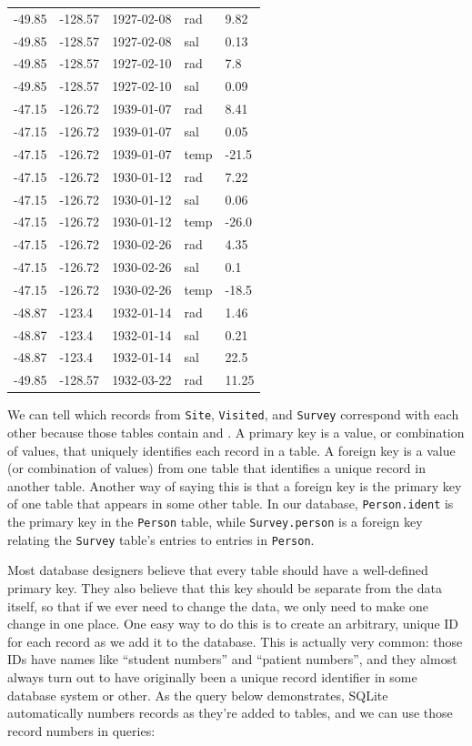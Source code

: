 \documentclass{book}
\begin{document}
\begin{tabular}{lllll}
-49.85 & -128.57 & 1927-02-08 & rad & 9.82 \\
-49.85 & -128.57 & 1927-02-08 & sal & 0.13 \\
-49.85 & -128.57 & 1927-02-10 & rad & 7.8 \\
-49.85 & -128.57 & 1927-02-10 & sal & 0.09 \\
-47.15 & -126.72 & 1939-01-07 & rad & 8.41 \\
-47.15 & -126.72 & 1939-01-07 & sal & 0.05 \\
-47.15 & -126.72 & 1939-01-07 & temp & -21.5 \\
-47.15 & -126.72 & 1930-01-12 & rad & 7.22 \\
-47.15 & -126.72 & 1930-01-12 & sal & 0.06 \\
-47.15 & -126.72 & 1930-01-12 & temp & -26.0 \\
-47.15 & -126.72 & 1930-02-26 & rad & 4.35 \\
-47.15 & -126.72 & 1930-02-26 & sal & 0.1 \\
-47.15 & -126.72 & 1930-02-26 & temp & -18.5 \\
-48.87 & -123.4 & 1932-01-14 & rad & 1.46 \\
-48.87 & -123.4 & 1932-01-14 & sal & 0.21 \\
-48.87 & -123.4 & 1932-01-14 & sal & 22.5 \\
-49.85 & -128.57 & 1932-03-22 & rad & 11.25 \\
\end{tabular}

We can tell which records from \texttt{Site}, \texttt{Visited}, and
\texttt{Survey} correspond with each other because those tables contain
 and
. A primary key is a value, or
combination of values, that uniquely identifies each record in a table.
A foreign key is a value (or combination of values) from one table that
identifies a unique record in another table. Another way of saying this
is that a foreign key is the primary key of one table that appears in
some other table. In our database, \texttt{Person.ident} is the primary
key in the \texttt{Person} table, while \texttt{Survey.person} is a
foreign key relating the \texttt{Survey} table's entries to entries in
\texttt{Person}.

Most database designers believe that every table should have a
well-defined primary key. They also believe that this key should be
separate from the data itself, so that if we ever need to change the
data, we only need to make one change in one place. One easy way to do
this is to create an arbitrary, unique ID for each record as we add it
to the database. This is actually very common: those IDs have names like
``student numbers'' and ``patient numbers'', and they almost always turn
out to have originally been a unique record identifier in some database
system or other. As the query below demonstrates, SQLite automatically
numbers records as they're added to tables, and we can use those record
numbers in queries:
\end{document}
